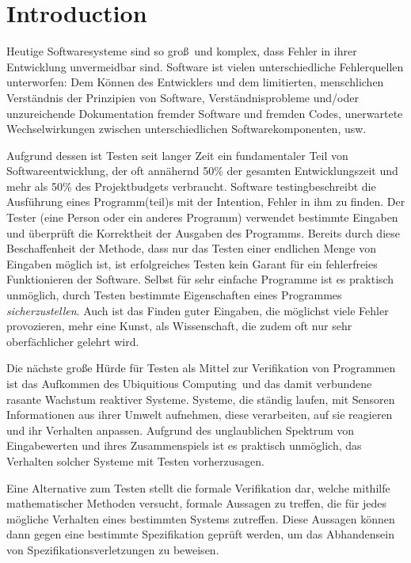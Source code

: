 \section{Introduction}
Heutige Softwaresysteme sind so gro\ss\ und komplex, dass Fehler in ihrer Entwicklung unvermeidbar sind.
Software ist vielen unterschiedliche Fehlerquellen unterworfen: Dem K\"onnen des Entwicklers und dem limitierten, menschlichen Verst\"andnis der Prinzipien von Software, Verst\"andnisprobleme und/oder unzureichende Dokumentation fremder Software und fremden Codes, unerwartete Wechselwirkungen zwischen unterschiedlichen Softwarekomponenten, usw.

Aufgrund dessen ist Testen seit langer Zeit ein fundamentaler Teil von Softwareentwicklung, der oft ann\"ahernd 50\% der gesamten Entwicklungszeit und mehr als 50\% des Projektbudgets verbraucht.
\glqq Software testing\grqq beschreibt die Ausf\"uhrung eines Programm(teil)s mit der Intention, Fehler in ihm zu finden.
Der Tester (eine Person oder ein anderes Programm) verwendet bestimmte Eingaben und \"uberpr\"uft die Korrektheit der Ausgaben des Programms.
Bereits durch diese Beschaffenheit der Methode, dass nur das Testen einer endlichen Menge von Eingaben m\"oglich ist, ist erfolgreiches Testen kein Garant f\"ur ein fehlerfreies Funktionieren der Software. Selbst f\"ur sehr einfache Programme ist es praktisch unm\"oglich, durch Testen bestimmte Eigenschaften eines Programmes \emph{sicherzustellen}.
Auch ist das Finden guter Eingaben, die m\"oglichst viele Fehler provozieren, mehr eine Kunst, als Wissenschaft, die zudem oft nur sehr oberf\"achlicher gelehrt wird.\cite{Myers2011}

Die n\"achste gro\ss e H\"urde f\"ur Testen als Mittel zur Verifikation von Programmen ist das Aufkommen des \glqq Ubiquitious Computing\grqq\ und das damit verbundene rasante Wachstum reaktiver Systeme. Systeme, die st\"andig laufen, mit Sensoren Informationen aus ihrer Umwelt aufnehmen, diese verarbeiten, auf sie reagieren und ihr Verhalten anpassen.
Aufgrund des unglaublichen Spektrum von Eingabewerten und ihres Zusammenspiels ist es praktisch unm\"oglich, das Verhalten solcher Systeme mit Testen vorherzusagen.

Eine Alternative zum Testen stellt die formale Verifikation dar, welche mithilfe mathematischer Methoden versucht, formale Aussagen zu treffen, die f\"ur jedes m\"ogliche Verhalten eines bestimmten Systems zutreffen. Diese Aussagen k\"onnen dann gegen eine bestimmte Spezifikation gepr\"uft werden, um das Abhandensein von Spezifikationsverletzungen zu beweisen.

